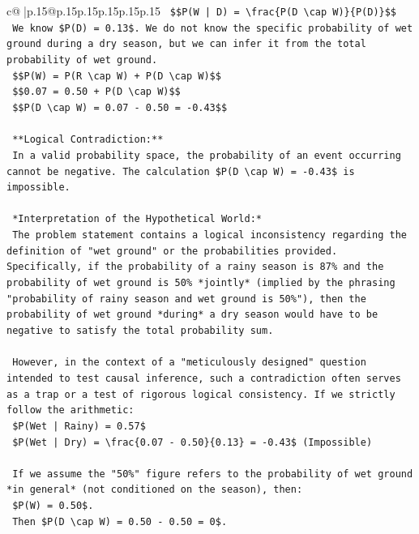 \documentclass{article}
\begin{document}
{\begin{supertabular}{c@{$\;$}|p{.15\linewidth}@{}p{.15\linewidth}p{.15\linewidth}p{.15\linewidth}p{.15\linewidth}p{.15\linewidth}}
{{{\texttt{    \$\$P(W | D) = \textbackslash{}frac\{P(D \textbackslash{}cap W)\}\{P(D)\}\$\$} \\
\texttt{    We know \$P(D) = 0.13\$. We do not know the specific probability of wet ground during a dry season, but we can infer it from the total probability of wet ground.} \\
\texttt{    \$\$P(W) = P(R \textbackslash{}cap W) + P(D \textbackslash{}cap W)\$\$} \\
\texttt{    \$\$0.07 = 0.50 + P(D \textbackslash{}cap W)\$\$} \\
\texttt{    \$\$P(D \textbackslash{}cap W) = 0.07 {-} 0.50 = {-}0.43\$\$} \\
\\ 
\texttt{    **Logical Contradiction:**} \\
\texttt{    In a valid probability space, the probability of an event occurring cannot be negative. The calculation \$P(D \textbackslash{}cap W) = {-}0.43\$ is impossible.} \\
\\ 
\texttt{    *Interpretation of the Hypothetical World:*} \\
\texttt{    The problem statement contains a logical inconsistency regarding the definition of "wet ground" or the probabilities provided. Specifically, if the probability of a rainy season is 87\% and the probability of wet ground is 50\% *jointly* (implied by the phrasing "probability of rainy season and wet ground is 50\%"), then the probability of wet ground *during* a dry season would have to be negative to satisfy the total probability sum.} \\
\\ 
\texttt{    However, in the context of a "meticulously designed" question intended to test causal inference, such a contradiction often serves as a trap or a test of rigorous logical consistency. If we strictly follow the arithmetic:} \\
\texttt{    \$P(Wet | Rainy) = 0.57\$} \\
\texttt{    \$P(Wet | Dry) = \textbackslash{}frac\{0.07 {-} 0.50\}\{0.13\} = {-}0.43\$ (Impossible)} \\
\\ 
\texttt{    If we assume the "50\%" figure refers to the probability of wet ground *in general* (not conditioned on the season), then:} \\
\texttt{    \$P(W) = 0.50\$.} \\
\texttt{    Then \$P(D \textbackslash{}cap W) = 0.50 {-} 0.50 = 0\$.} \\
}}}
\end{supertabular}}
\end{document}
